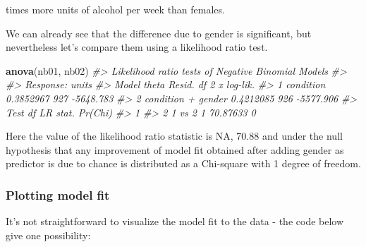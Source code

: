 \documentclass[
]{book}
\newenvironment{Shaded}{\begin{snugshade}}{\end{snugshade}}
\newcommand{\CommentTok}[1]{\textcolor[rgb]{0.56,0.35,0.01}{\textit{#1}}}
\newcommand{\FunctionTok}[1]{\textcolor[rgb]{0.13,0.29,0.53}{\textbf{#1}}}
\newcommand{\NormalTok}[1]{#1}
\newcommand{\SpecialCharTok}[1]{\textcolor[rgb]{0.81,0.36,0.00}{\textbf{#1}}}
\newcommand{\StringTok}[1]{\textcolor[rgb]{0.31,0.60,0.02}{#1}}
\begin{document}
\begin{Shaded}
\end{Shaded}

times more units of alcohol per week than females.

We can already see that the difference due to gender is significant, but nevertheless let's compare them using a likelihood ratio test.

\begin{Shaded}
\begin{Highlighting}[]
\FunctionTok{anova}\NormalTok{(nb01, nb02)}
\CommentTok{\#\textgreater{} Likelihood ratio tests of Negative Binomial Models}
\CommentTok{\#\textgreater{} }
\CommentTok{\#\textgreater{} Response: units}
\CommentTok{\#\textgreater{}                Model     theta Resid. df    2 x log{-}lik.}
\CommentTok{\#\textgreater{} 1          condition 0.3852967       927       {-}5648.783}
\CommentTok{\#\textgreater{} 2 condition + gender 0.4212085       926       {-}5577.906}
\CommentTok{\#\textgreater{}     Test    df LR stat. Pr(Chi)}
\CommentTok{\#\textgreater{} 1                              }
\CommentTok{\#\textgreater{} 2 1 vs 2     1 70.87633       0}
\end{Highlighting}
\end{Shaded}

Here the value of the likelihood ratio statistic is NA, 70.88 and under the null hypothesis that any improvement of model fit obtained after adding gender as predictor is due to chance is distributed as a Chi-square with 1 degree of freedom.

\subsubsection{Plotting model fit}\label{plotting-model-fit}

It's not straightforward to visualize the model fit to the data - the code below give one possibility:
\end{document}
